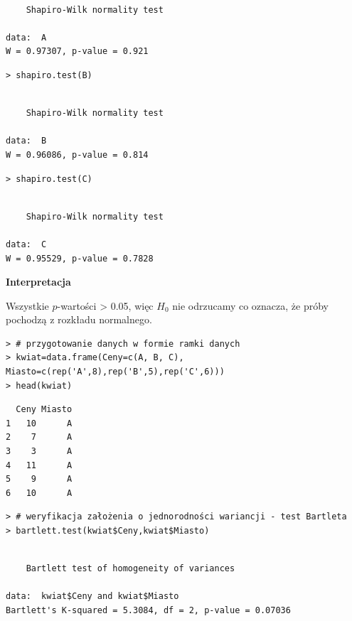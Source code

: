 \documentclass[12pt,B5paper,]{book}
\begin{document}
\begin{verbatim}

    Shapiro-Wilk normality test

data:  A
W = 0.97307, p-value = 0.921
\end{verbatim}

\begin{verbatim}
> shapiro.test(B)
\end{verbatim}

\begin{verbatim}

    Shapiro-Wilk normality test

data:  B
W = 0.96086, p-value = 0.814
\end{verbatim}

\begin{verbatim}
> shapiro.test(C)
\end{verbatim}

\begin{verbatim}

    Shapiro-Wilk normality test

data:  C
W = 0.95529, p-value = 0.7828
\end{verbatim}

\vspace{0.8cm} \textbf{Interpretacja}

Wszystkie \(p\)-wartości \textgreater{} 0.05, więc \(H_0\) nie odrzucamy
co oznacza, że próby pochodzą z rozkładu normalnego.

\vspace{0.8cm}

\begin{verbatim}
> # przygotowanie danych w formie ramki danych
> kwiat=data.frame(Ceny=c(A, B, C), Miasto=c(rep('A',8),rep('B',5),rep('C',6)))
> head(kwiat)
\end{verbatim}

\begin{verbatim}
  Ceny Miasto
1   10      A
2    7      A
3    3      A
4   11      A
5    9      A
6   10      A
\end{verbatim}

\begin{verbatim}
> # weryfikacja założenia o jednorodności wariancji - test Bartleta
> bartlett.test(kwiat$Ceny,kwiat$Miasto)
\end{verbatim}

\begin{verbatim}

    Bartlett test of homogeneity of variances

data:  kwiat$Ceny and kwiat$Miasto
Bartlett's K-squared = 5.3084, df = 2, p-value = 0.07036
\end{verbatim}
\end{document}
